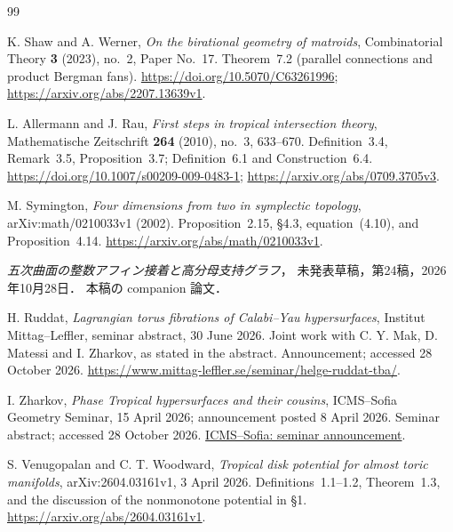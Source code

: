 \begin{thebibliography}{99}

K. Shaw and A. Werner,
\emph{On the birational geometry of matroids},
Combinatorial Theory \textbf{3} (2023), no.~2, Paper No.~17.
Theorem~7.2 (parallel connections and product Bergman fans).
\url{https://doi.org/10.5070/C63261996};
\url{https://arxiv.org/abs/2207.13639v1}.

L. Allermann and J. Rau,
\emph{First steps in tropical intersection theory},
Mathematische Zeitschrift \textbf{264} (2010), no.~3, 633--670.
Definition~3.4, Remark~3.5, Proposition~3.7;
Definition~6.1 and Construction~6.4.
\url{https://doi.org/10.1007/s00209-009-0483-1};
\url{https://arxiv.org/abs/0709.3705v3}.

M. Symington,
\emph{Four dimensions from two in symplectic topology},
arXiv:math/0210033v1 (2002).
Proposition~2.15, \S4.3, equation~(4.10), and Proposition~4.14.
\url{https://arxiv.org/abs/math/0210033v1}.

\emph{五次曲面の整数アフィン接着と高分母支持グラフ}，
未発表草稿，第24稿，2026年10月28日．
本稿の companion 論文．


H. Ruddat,
\emph{Lagrangian torus fibrations of Calabi--Yau hypersurfaces},
Institut Mittag--Leffler, seminar abstract, 30 June 2026.
Joint work with C. Y. Mak, D. Matessi and I. Zharkov, as stated in the abstract.
Announcement; accessed 28 October 2026.
\url{https://www.mittag-leffler.se/seminar/helge-ruddat-tba/}.

I. Zharkov,
\emph{Phase Tropical hypersurfaces and their cousins},
ICMS--Sofia Geometry Seminar, 15 April 2026; announcement posted 8 April 2026.
Seminar abstract; accessed 28 October 2026.
\href{https://icms.bg/phase-tropical-hypersurfaces-and-their-cousins-geometry-seminar-talk-by-ilia-zharkov/}{ICMS--Sofia: seminar announcement}.


S. Venugopalan and C. T. Woodward,
\emph{Tropical disk potential for almost toric manifolds},
arXiv:2604.03161v1, 3 April 2026.
Definitions~1.1--1.2, Theorem~1.3, and the discussion of the nonmonotone potential in \S1.
\url{https://arxiv.org/abs/2604.03161v1}.

\end{thebibliography}
